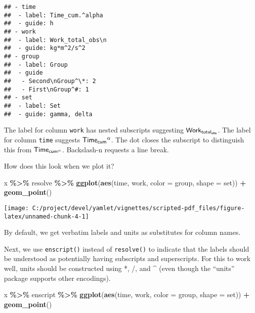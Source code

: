 \documentclass[
]{article}
\newenvironment{Shaded}{\begin{snugshade}}{\end{snugshade}}
\newcommand{\AttributeTok}[1]{\textcolor[rgb]{0.13,0.29,0.53}{#1}}
\newcommand{\FunctionTok}[1]{\textcolor[rgb]{0.13,0.29,0.53}{\textbf{#1}}}
\newcommand{\NormalTok}[1]{#1}
\newcommand{\SpecialCharTok}[1]{\textcolor[rgb]{0.81,0.36,0.00}{\textbf{#1}}}
\begin{document}
\begin{verbatim}
## - time
##  - label: Time_cum.^alpha
##  - guide: h
## - work
##  - label: Work_total_obs\n
##  - guide: kg*m^2/s^2
## - group
##  - label: Group
##  - guide
##   - Second\nGroup^\*: 2
##   - First\nGroup^#: 1
## - set
##  - label: Set
##  - guide: gamma, delta
\end{verbatim}

The label for column \texttt{work} has nested subscripts suggesting
\(\sf{Work_{total_{obs}}}\). The label for column \texttt{time} suggests
\(\sf{Time_{cum}{}^{\alpha}}\). The dot closes the subscript to
distinguish this from \(\sf{Time_{cum^{\alpha}}}\). Backslash-n requests
a line break.

How does this look when we plot it?

\begin{Shaded}
\begin{Highlighting}[]
\NormalTok{x }\SpecialCharTok{\%\textgreater{}\%} 
\NormalTok{  resolve }\SpecialCharTok{\%\textgreater{}\%} 
  \FunctionTok{ggplot}\NormalTok{(}\FunctionTok{aes}\NormalTok{(time, work, }\AttributeTok{color =}\NormalTok{ group, }\AttributeTok{shape =}\NormalTok{ set)) }\SpecialCharTok{+} 
  \FunctionTok{geom\_point}\NormalTok{()}
\end{Highlighting}
\end{Shaded}

\texttt{[image: C:/project/devel/yamlet/vignettes/scripted-pdf\_files/figure-latex/unnamed-chunk-4-1]}

By default, we get verbatim labels and units as substitutes for column
names.

Next, we use \texttt{enscript()} instead of \texttt{resolve()} to
indicate that the labels should be understood as potentially having
subscripts and superscripts. For this to work well, units should be
constructed using *, /, and \^{} (even though the ``units'' package
supports other encodings).

\begin{Shaded}
\begin{Highlighting}[]
\NormalTok{x }\SpecialCharTok{\%\textgreater{}\%} 
\NormalTok{  enscript }\SpecialCharTok{\%\textgreater{}\%} 
  \FunctionTok{ggplot}\NormalTok{(}\FunctionTok{aes}\NormalTok{(time, work, }\AttributeTok{color =}\NormalTok{ group, }\AttributeTok{shape =}\NormalTok{ set)) }\SpecialCharTok{+} 
  \FunctionTok{geom\_point}\NormalTok{()}
\end{Highlighting}
\end{Shaded}
\end{document}
